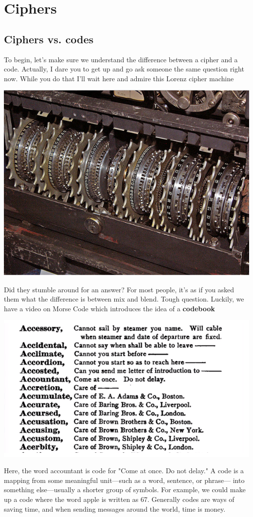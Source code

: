 \documentclass{report}
\begin{document}
\chapter{Ciphers}
\newpage
\section{Ciphers vs. codes}
To begin, let’s make sure we understand the difference between a cipher and a code. Actually, I dare you to get up and go ask someone the same question right now. While you do that I’ll wait here and admire this Lorenz cipher machine
\begin{center}
	\includegraphics[scale=1]{9.png}
\end{center}Did they stumble around for an answer? For most people, it’s as if you asked them what the difference is between mix and blend. Tough question. Luckily, we have a video on  Morse Code which introduces the idea of a \textbf{codebook}
\begin{center}
	\includegraphics[scale=1]{10.png}
\end{center}Here, the word accountant is code for "Come at once. Do not delay." A code is a mapping from some meaningful unit—such as a word, sentence, or phrase— into something else—usually a shorter group of symbols. For example, we could make up a code where the word apple is written as 67. Generally codes are ways of saving time, and when sending messages around the world, time is money.\\
\end{document}
